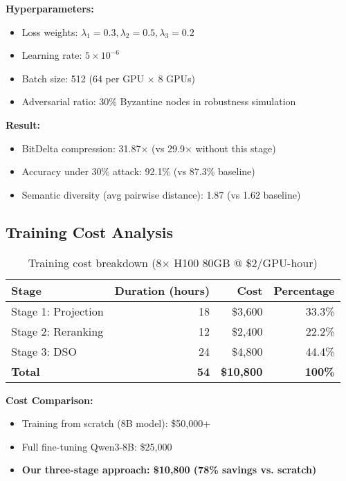 \documentclass[11pt,a4paper]{article}
\begin{document}
\textbf{Hyperparameters:}
\begin{itemize}
\item Loss weights: $\lambda_1=0.3, \lambda_2=0.5, \lambda_3=0.2$
\item Learning rate: $5 \times 10^{-6}$
\item Batch size: 512 (64 per GPU $\times$ 8 GPUs)
\item Adversarial ratio: 30\% Byzantine nodes in robustness simulation
\end{itemize}

\textbf{Result:}
\begin{itemize}
\item BitDelta compression: 31.87$\times$ (vs 29.9$\times$ without this stage)
\item Accuracy under 30\% attack: 92.1\% (vs 87.3\% baseline)
\item Semantic diversity (avg pairwise distance): 1.87 (vs 1.62 baseline)
\end{itemize}

\subsection{Training Cost Analysis}

\begin{table}[h]
\centering
\caption{Training cost breakdown (8$\times$ H100 80GB @ \$2/GPU-hour)}
\begin{tabular}{lrrr}
\toprule
\textbf{Stage} & \textbf{Duration (hours)} & \textbf{Cost} & \textbf{Percentage} \\
\midrule
Stage 1: Projection & 18 & \$3,600 & 33.3\% \\
Stage 2: Reranking & 12 & \$2,400 & 22.2\% \\
Stage 3: DSO & 24 & \$4,800 & 44.4\% \\
\midrule
\textbf{Total} & \textbf{54} & \textbf{\$10,800} & \textbf{100\%} \\
\bottomrule
\end{tabular}
\end{table}

\textbf{Cost Comparison:}
\begin{itemize}
\item Training from scratch (8B model): \$50,000+
\item Full fine-tuning Qwen3-8B: \$25,000
\item \textbf{Our three-stage approach: \$10,800 (78\% savings vs. scratch)}
\end{itemize}
\end{document}
